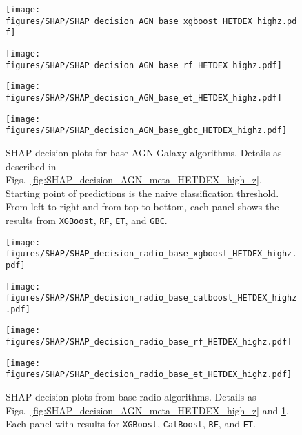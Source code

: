 \documentclass{aa}
\begin{document}
\begin{appendix}
\begin{figure}
  \centering
  \begin{minipage}{0.49\columnwidth}
    \centering
    \texttt{[image: figures/SHAP/SHAP\_decision\_AGN\_base\_xgboost\_HETDEX\_highz.pdf]}
  \end{minipage}%
  \hfill
  \begin{minipage}{0.49\columnwidth}
    \centering
    \texttt{[image: figures/SHAP/SHAP\_decision\_AGN\_base\_rf\_HETDEX\_highz.pdf]}
  \end{minipage}\break%
  \begin{minipage}{0.49\columnwidth}
    \centering
    \texttt{[image: figures/SHAP/SHAP\_decision\_AGN\_base\_et\_HETDEX\_highz.pdf]}
  \end{minipage}%
  \hfill
  \begin{minipage}{0.49\columnwidth}
    \centering
    \texttt{[image: figures/SHAP/SHAP\_decision\_AGN\_base\_gbc\_HETDEX\_highz.pdf]}
  \end{minipage}
  \caption{SHAP decision plots for base AGN-Galaxy algorithms. Details as described in Figs.~\ref{fig:SHAP_decision_AGN_meta_HETDEX_high_z}. Starting point of predictions is the naive classification threshold. From left to right and from top to bottom, each panel shows the results from \texttt{XGBoost}, \texttt{RF}, \texttt{ET}, and \texttt{GBC}.}
  \label{fig:SHAP_decision_AGN_base_HETDEX_high_z}
\end{figure}

\begin{figure}
  \centering
  \begin{minipage}{0.49\columnwidth}
    \centering
    \texttt{[image: figures/SHAP/SHAP\_decision\_radio\_base\_xgboost\_HETDEX\_highz.pdf]}
  \end{minipage}%
  \hfill
  \begin{minipage}{0.49\columnwidth}
    \centering
    \texttt{[image: figures/SHAP/SHAP\_decision\_radio\_base\_catboost\_HETDEX\_highz.pdf]}
  \end{minipage}\break%
  \begin{minipage}{0.49\columnwidth}
    \centering
    \texttt{[image: figures/SHAP/SHAP\_decision\_radio\_base\_rf\_HETDEX\_highz.pdf]}
  \end{minipage}%
  \hfill
  \begin{minipage}{0.49\columnwidth}
    \centering
    \texttt{[image: figures/SHAP/SHAP\_decision\_radio\_base\_et\_HETDEX\_highz.pdf]}
  \end{minipage}
  \caption{SHAP decision plots from base radio algorithms. Details as Figs.~\ref{fig:SHAP_decision_AGN_meta_HETDEX_high_z} and \ref{fig:SHAP_decision_AGN_base_HETDEX_high_z}. Each panel with results for \texttt{XGBoost}, \texttt{CatBoost}, \texttt{RF}, and \texttt{ET}.}
  \label{fig:SHAP_decision_radio_base_HETDEX_high_z}
\end{figure}


\end{appendix}
\end{document}
